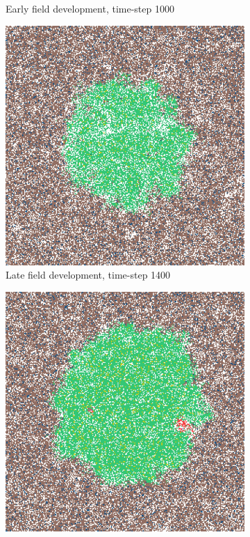 \documentclass[\main/thesis.tex]{subfiles}
\begin{document}
\begin{figure}[H]
\begin{subfigure}[t]{.45\textwidth}
      \caption{Early field development, time-step 1000}
      \label{fig:GeneralObservations_earlyField}
    \end{subfigure}
    \begin{subfigure}[t]{.45\textwidth}
      \centering
      \includegraphics[width=\textwidth]{images/2_GeneralObservations/Fig5/3_late_field_1400.jpeg}
      \caption{Late field development, time-step 1400}
      \label{fig:GeneralObservations_lateField}
    \end{subfigure}
    \begin{subfigure}[t]{.45\textwidth}
      \centering
      \includegraphics[width=\textwidth]{images/2_GeneralObservations/Fig5/4_early_tumour_1975.jpeg}

\end{subfigure}
\end{figure}
\end{document}
